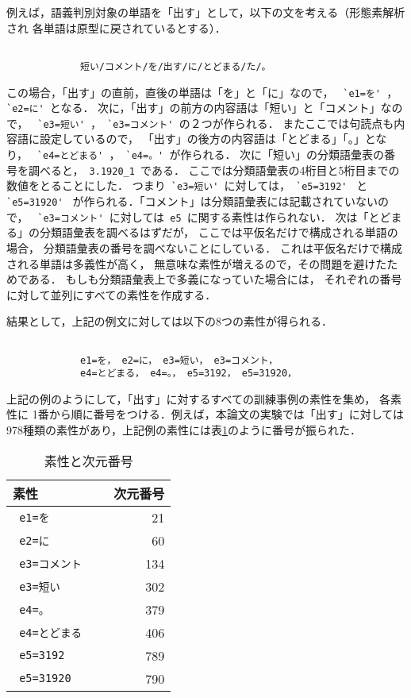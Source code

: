 例えば，語義判別対象の単語を「出す」として，以下の文を考える（形態素解析され
各単語は原型に戻されているとする）．
\begin{verbatim}

             短い/コメント/を/出す/に/とどまる/た/。

\end{verbatim}
\noindent 
この場合，「出す」の直前，直後の単語は「を」と「に」なので，
\verb| `e1=を' |，\verb| `e2=に' |となる．
次に，「出す」の前方の内容語は「短い」と「コメント」なので，
\verb| `e3=短い' |，\verb| `e3=コメント' |の２つが作られる．
またここでは句読点も内容語に設定しているので，
「出す」の後方の内容語は「とどまる」「。」となり，
\verb| `e4=とどまる' |，\verb| `e4=。' |が作られる．
次に「短い」の分類語彙表\cite{bunrui-tab}の番号を調べると，\verb| 3.1920_1 |である．
ここでは分類語彙表の4桁目と5桁目までの数値をとることにした．
つまり\verb| `e3=短い' |に対しては，\verb| `e5=3192' | と \verb| `e5=31920' | 
が作られる．「コメント」は分類語彙表には記載されていないので，
\verb| `e3=コメント' |に対しては\verb| e5 |に関する素性は作られない．
次は「とどまる」の分類語彙表を調べるはずだが，
ここでは平仮名だけで構成される単語の場合，
分類語彙表の番号を調べないことにしている．
これは平仮名だけで構成される単語は多義性が高く，
無意味な素性が増えるので，その問題を避けたためである．
もしも分類語彙表上で多義になっていた場合には，
それぞれの番号に対して並列にすべての素性を作成する．

結果として，上記の例文に対しては以下の8つの素性が得られる．
\begin{verbatim}

             e1=を， e2=に， e3=短い， e3=コメント，
             e4=とどまる， e4=。， e5=3192， e5=31920，

\end{verbatim}

上記の例のようにして，「出す」に対するすべての訓練事例の素性を集め，
各素性に 1番から順に番号をつける．例えば，本論文の実験では「出す」に対しては
978種類の素性があり，上記例の素性には\mbox{表\ref{sosei-jigen}}のように番号が振られた．

\begin{table}[htbp]
  \begin{center}
    \leavevmode
    \caption{素性と次元番号}
    \begin{tabular}{lcr}  \hline
素性          &  & 次元番号 \\  \hline
     \verb| e1=を| &  &   21 \\
     \verb| e2=に | &  &   60 \\
     \verb| e3=コメント | & &  134 \\
     \verb| e3=短い | & & 302 \\
     \verb| e4=。 |  & &   379 \\
     \verb| e4=とどまる | & &   406 \\
     \verb| e5=3192 | & &  789 \\
     \verb| e5=31920 | & &  790 \\ \hline
    \end{tabular} \label{sosei-jigen}
  \end{center}
\end{table}

